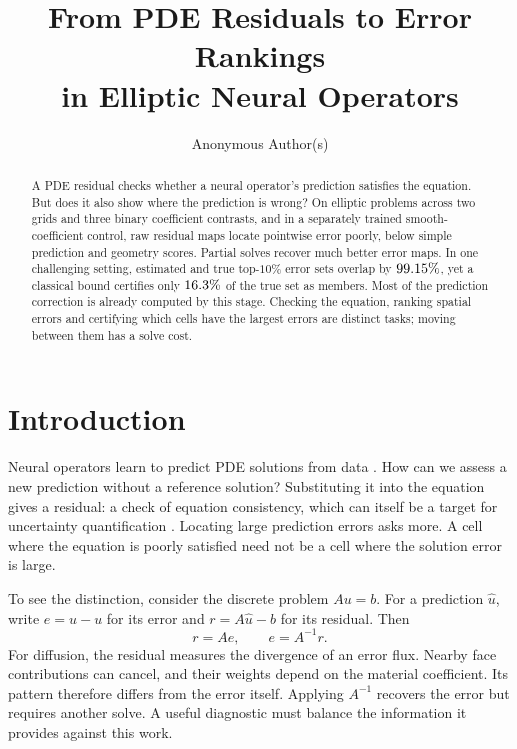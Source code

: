 \documentclass{article}
\title{From PDE Residuals to Error Rankings\\in Elliptic Neural Operators}
\author{Anonymous Author(s)}
\begin{document}
\maketitle

\begin{abstract}
A PDE residual checks whether a neural operator's prediction satisfies the equation. But does it
also show where the prediction is wrong? On elliptic problems across two grids and three binary
coefficient contrasts, and in a separately trained smooth-coefficient control, raw residual maps
locate pointwise error poorly, below simple prediction and geometry scores. Partial solves recover
much better error maps. In one challenging setting, estimated and true top-$10\%$ error sets
overlap by $99.15\%$, yet a classical bound certifies only
$16.3\%$ of the true set as members. Most of the prediction
correction is already computed by this stage. Checking the equation, ranking spatial errors and
certifying which cells have the largest errors are distinct tasks; moving between them has a solve cost.
\end{abstract}

\section{Introduction}
Neural operators learn to predict PDE solutions from data \citep{li2021fourier}. How can we assess a
new prediction without a reference solution? Substituting it into the equation gives a residual: a
check of equation consistency, which can itself be a target for uncertainty quantification
\citep{gopakumar2025calibratedphysicsinformeduncertaintyquantification}. Locating large prediction
errors asks more. A cell where the equation is poorly satisfied need not be a cell where the solution
error is large.

To see the distinction, consider the discrete problem $Au=b$. For a prediction $\hat u$, write
$e=\hat u-u$ for its error and $r=A\hat u-b$ for its residual. Then
\begin{equation}
 r=Ae,\qquad e=A^{-1}r.
 \label{eq:identity}
\end{equation}
For diffusion, the residual measures the divergence of an error flux. Nearby face contributions can
cancel, and their weights depend on the material coefficient. Its pattern therefore differs from the
error itself. Applying $A^{-1}$ recovers the error but requires another solve. A useful diagnostic must
balance the information it provides against this work.
\end{document}
